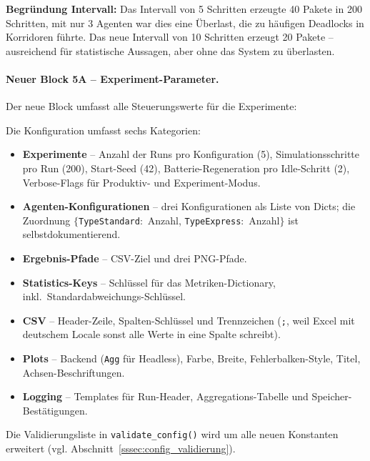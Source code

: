 \textbf{Begründung Intervall:} Das Intervall von 5 Schritten erzeugte 40 Pakete in 200 Schritten, mit nur 3 Agenten war dies eine Überlast, die zu häufigen Deadlocks in Korridoren führte. Das neue Intervall von 10 Schritten erzeugt 20 Pakete -- ausreichend für statistische Aussagen, aber ohne das System zu überlasten.

\paragraph{Neuer Block 5A – Experiment-Parameter.}
Der neue Block umfasst alle Steuerungswerte für die Experimente:



Die Konfiguration umfasst sechs Kategorien:
\begin{itemize}
    \item \textbf{Experimente} -- Anzahl der Runs pro Konfiguration (5), Simulationsschritte pro Run (200), Start-Seed (42), Batterie-Regeneration pro Idle-Schritt (2), Verbose-Flags für Produktiv- und Experiment-Modus.
    \item \textbf{Agenten-Konfigurationen} -- drei Konfigurationen als Liste von Dicts; die Zuordnung $\{$\texttt{TypeStandard}$:$ Anzahl, \texttt{TypeExpress}$:$ Anzahl$\}$ ist selbstdokumentierend.
    \item \textbf{Ergebnis-Pfade} -- CSV-Ziel und drei PNG-Pfade.
    \item \textbf{Statistics-Keys} -- Schlüssel für das Metriken-Dictionary, inkl.\ Standardabweichungs-Schlüssel.
    \item \textbf{CSV} -- Header-Zeile, Spalten-Schlüssel und Trennzeichen (\texttt{;}, weil Excel mit deutschem Locale sonst alle Werte in eine Spalte schreibt).
    \item \textbf{Plots} -- Backend (\texttt{Agg} für Headless), Farbe, Breite, Fehlerbalken-Style, Titel, Achsen-Beschriftungen.
    \item \textbf{Logging} -- Templates für Run-Header, Aggregations-Tabelle und Speicher-Bestätigungen.
\end{itemize}

Die Validierungsliste in \texttt{validate\_config()} wird um alle neuen Konstanten erweitert (vgl. Abschnitt~\ref{sssec:config_validierung}).


